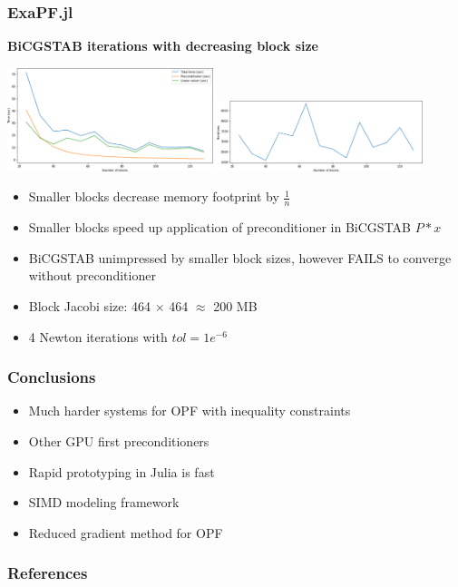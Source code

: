 \begin{frame}[fragile]
  \frametitle{ExaPF.jl}
  {\bf BiCGSTAB iterations with decreasing block size}
  \begin{center}
   \includegraphics[width=0.45\textwidth]{figures/blocks}
   \includegraphics[width=0.45\textwidth]{figures/bicgstabiter}
  \end{center}
  \begin{itemize}
    \item Smaller blocks decrease memory footprint by $\frac{1}{n}$ 
    \item Smaller blocks speed up application of preconditioner in BiCGSTAB $P * x$
    \item BiCGSTAB unimpressed by smaller block sizes, however FAILS to converge without preconditioner
    \item Block Jacobi size: 464 $\times$ 464 $\approx$ 200 MB
    \item 4 Newton iterations with $tol = 1e^{-6}$
  \end{itemize}
\end{frame}

\begin{frame}
  \frametitle{Conclusions}
  \begin{itemize}
    \item Much harder systems for OPF with inequality constraints
    \item Other GPU first preconditioners
    \item Rapid prototyping in Julia is fast
    \item SIMD modeling framework
    \item Reduced gradient method for OPF
  \end{itemize}
\end{frame}

\begin{frame}
  \frametitle{References}
  \printbibliography
\end{frame}



